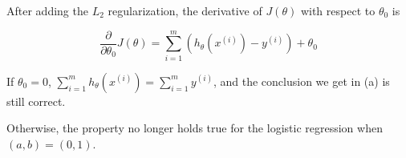 \begin{answer}
	After adding the $L_2$ regularization, the derivative of $J(\theta)$ with respect to $\theta_0$ is
	
	$$
	\frac{\partial}{\partial \theta_0} J(\theta) = \sum_{i = 1}^{m} (h_{\theta}(x^{(i)}) - y^{(i)}) + \theta_0
	$$
	
	If $\theta_0 = 0$, $\sum_{i = 1}^{m} h_{\theta}(x^{(i)}) = \sum_{i = 1}^{m} y^{(i)}$, and the conclusion we get in (a) is still correct.
	
	Otherwise, the property no longer holds true for the logistic regression when $(a,b)=(0,1)$.
\end{answer}

